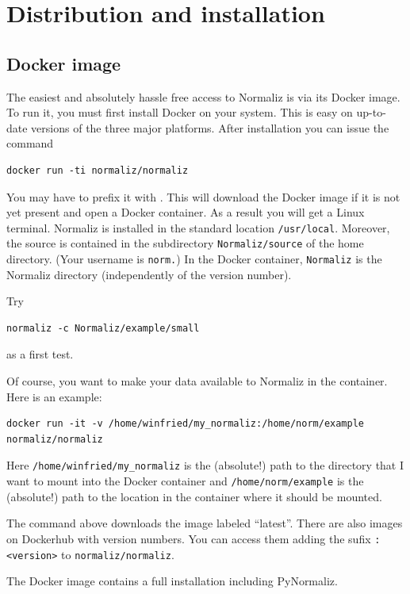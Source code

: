 
\section{Distribution and installation}\label{Distr}

\subsection{Docker image}
The easiest and absolutely hassle free access to Normaliz is via its Docker image. To run it, you must first install Docker on your system. This is easy on up-to-date versions of the three major platforms. After installation you can issue the command
\begin{Verbatim}
docker run -ti normaliz/normaliz
\end{Verbatim}
You may have to prefix it with . This will download the Docker image if it is not yet present and open a Docker container. As a result you will get a Linux terminal. Normaliz is installed in the standard location \verb|/usr/local|. Moreover, the source is contained in the subdirectory \verb|Normaliz/source| of the home directory. (Your username is \verb|norm.|) In the Docker container, \verb|Normaliz| is the Normaliz directory (independently of the version number).

Try
\begin{Verbatim}
normaliz -c Normaliz/example/small
\end{Verbatim}
as a first test.

Of course, you want to make your data available to Normaliz in the container. Here is an example:
\begin{Verbatim}
docker run -it -v /home/winfried/my_normaliz:/home/norm/example  normaliz/normaliz
\end{Verbatim}
Here \verb|/home/winfried/my_normaliz| is the (absolute!) path to the directory that I want to mount into the Docker container and \verb|/home/norm/example| is the (absolute!) path to the location in the container where it should be mounted.

The command above downloads the image labeled ``latest''.  There are also images on Dockerhub with version numbers. You can access them adding the sufix \verb|:<version>| to \verb|normaliz/normaliz|. 

The Docker image contains a full installation including PyNormaliz.

